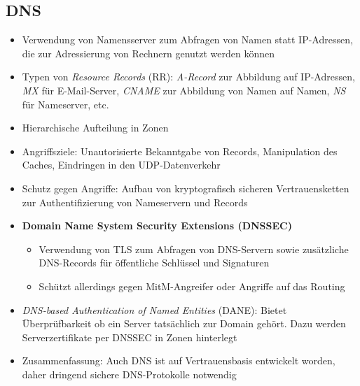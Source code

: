 \subsection{DNS}
\begin{itemize}
	\item Verwendung von Namensserver zum Abfragen von Namen statt IP-Adressen, die zur Adressierung von Rechnern genutzt werden können
	\item Typen von \textit{Resource Records} (RR): \textit{A-Record} zur Abbildung auf IP-Adressen, \textit{MX} für E-Mail-Server, \textit{CNAME} zur Abbildung von Namen auf Namen, \textit{NS} für Nameserver, etc.
	\item Hierarchische Aufteilung in Zonen
	\item Angriffsziele: Unautorisierte Bekanntgabe von Records, Manipulation des Caches, Eindringen in den UDP-Datenverkehr
	\item Schutz gegen Angriffe: Aufbau von kryptografisch sicheren Vertrauensketten zur Authentifizierung von Nameservern und Records
	\item \textbf{Domain Name System Security Extensions (DNSSEC)}
	\begin{itemize}
		\item Verwendung von TLS zum Abfragen von DNS-Servern sowie zusätzliche DNS-Records für öffentliche Schlüssel und Signaturen
		\item Schützt allerdings gegen MitM-Angreifer oder Angriffe auf das Routing
	\end{itemize}
	\item \textit{DNS-based Authentication of Named Entities} (DANE): Bietet Überprüfbarkeit ob ein Server tatsächlich zur Domain gehört. Dazu werden Serverzertifikate per DNSSEC in Zonen hinterlegt
	\item Zusammenfassung: Auch DNS ist auf Vertrauensbasis entwickelt worden, daher dringend sichere DNS-Protokolle notwendig
\end{itemize}


